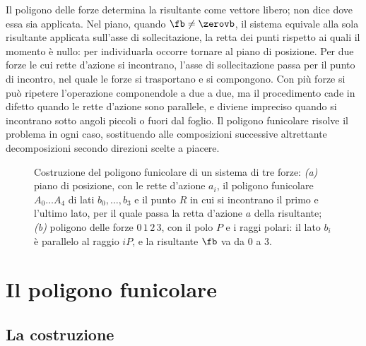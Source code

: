 Il poligono delle forze determina la risultante come vettore libero; non dice dove essa sia
applicata. Nel piano, quando $\fb \neq \zerovb$, il sistema equivale alla sola risultante applicata
sull'asse di sollecitazione, la retta dei punti rispetto ai quali il momento è nullo: per
individuarla occorre tornare al piano di posizione. Per due forze le cui rette d'azione si
incontrano, l'asse di sollecitazione passa per il punto di incontro, nel quale le forze si
trasportano e si compongono. Con più forze si può ripetere l'operazione componendole a due a due,
ma il procedimento cade in difetto quando le rette d'azione sono parallele, e diviene impreciso
quando si incontrano sotto angoli piccoli o fuori dal foglio. Il poligono funicolare risolve il
problema in ogni caso, sostituendo alle composizioni successive altrettante decomposizioni secondo
direzioni scelte a piacere.

\begin{figure}[htbp]
	\centering
	\caption{Costruzione del poligono funicolare di un sistema di tre forze: \emph{(a)} piano di
		posizione, con le rette d'azione $a_i$, il poligono funicolare $A_0 \dots A_4$ di lati
		$b_0, \dots, b_3$ e il punto $R$ in cui si incontrano il primo e l'ultimo lato, per il quale
		passa la retta d'azione $a$ della risultante; \emph{(b)} poligono delle forze $0\,1\,2\,3$, con
		il polo $P$ e i raggi polari: il lato $b_i$ è parallelo al raggio $iP$, e la risultante $\fb$
		va da $0$ a $3$.}
	\label{fig:costruzione_sgr}
\end{figure}

\section{Il poligono funicolare}
\label{sec:poligono_funicolare_sgr}

\subsection{La costruzione}
\label{sec:costruzione_sgr}

